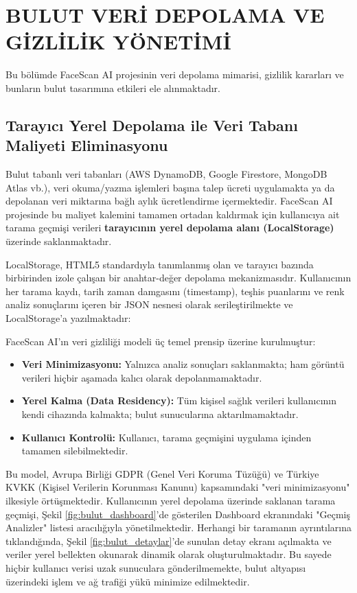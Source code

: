 \section{BULUT VERİ DEPOLAMA VE GİZLİLİK YÖNETİMİ}

Bu bölümde FaceScan AI projesinin veri depolama mimarisi, gizlilik kararları ve bunların bulut tasarımına etkileri ele alınmaktadır.

\subsection{Tarayıcı Yerel Depolama ile Veri Tabanı Maliyeti Eliminasyonu}

Bulut tabanlı veri tabanları (AWS DynamoDB, Google Firestore, MongoDB Atlas vb.), veri okuma/yazma işlemleri başına talep ücreti uygulamakta ya da depolanan veri miktarına bağlı aylık ücretlendirme içermektedir. FaceScan AI projesinde bu maliyet kalemini tamamen ortadan kaldırmak için kullanıcıya ait tarama geçmişi verileri \textbf{tarayıcının yerel depolama alanı (LocalStorage)} üzerinde saklanmaktadır.

LocalStorage, HTML5 standardıyla tanımlanmış olan ve tarayıcı bazında birbirinden izole çalışan bir anahtar-değer depolama mekanizmasıdır. Kullanıcının her tarama kaydı, tarih zaman damgasını (timestamp), teşhis puanlarını ve renk analiz sonuçlarını içeren bir JSON nesnesi olarak serileştirilmekte ve LocalStorage'a yazılmaktadır:

FaceScan AI'ın veri gizliliği modeli üç temel prensip üzerine kurulmuştur:
\begin{itemize}
  \item \textbf{Veri Minimizasyonu:} Yalnızca analiz sonuçları saklanmakta; ham görüntü verileri hiçbir aşamada kalıcı olarak depolanmamaktadır.
  \item \textbf{Yerel Kalma (Data Residency):} Tüm kişisel sağlık verileri kullanıcının kendi cihazında kalmakta; bulut sunucularına aktarılmamaktadır.
  \item \textbf{Kullanıcı Kontrolü:} Kullanıcı, tarama geçmişini uygulama içinden tamamen silebilmektedir.
\end{itemize}

Bu model, Avrupa Birliği GDPR (Genel Veri Koruma Tüzüğü) ve Türkiye KVKK (Kişisel Verilerin Korunması Kanunu) kapsamındaki "veri minimizasyonu" ilkesiyle örtüşmektedir. Kullanıcının yerel depolama üzerinde saklanan tarama geçmişi, Şekil \ref{fig:bulut_dashboard}'de gösterilen Dashboard ekranındaki "Geçmiş Analizler" listesi aracılığıyla yönetilmektedir. Herhangi bir taramanın ayrıntılarına tıklandığında, Şekil \ref{fig:bulut_detaylar}'de sunulan detay ekranı açılmakta ve veriler yerel bellekten okunarak dinamik olarak oluşturulmaktadır. Bu sayede hiçbir kullanıcı verisi uzak sunuculara gönderilmemekte, bulut altyapısı üzerindeki işlem ve ağ trafiği yükü minimize edilmektedir.

